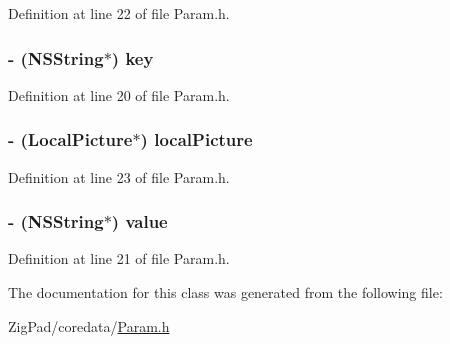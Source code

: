Definition at line 22 of file Param.h.

\hypertarget{interface_param_a0b6a9866e1390620790387442c1fb8be}{
\subsubsection[{key}]{\setlength{\rightskip}{0pt plus 5cm}-\/ (NSString$\ast$) key}}
\label{interface_param_a0b6a9866e1390620790387442c1fb8be}


Definition at line 20 of file Param.h.

\hypertarget{interface_param_a188b0e359426f49c922be3306c54e028}{
\subsubsection[{localPicture}]{\setlength{\rightskip}{0pt plus 5cm}-\/ ({\bf LocalPicture}$\ast$) localPicture}}
\label{interface_param_a188b0e359426f49c922be3306c54e028}


Definition at line 23 of file Param.h.

\hypertarget{interface_param_a450e6764e415b0f430eac319e099ba48}{
\subsubsection[{value}]{\setlength{\rightskip}{0pt plus 5cm}-\/ (NSString$\ast$) value}}
\label{interface_param_a450e6764e415b0f430eac319e099ba48}


Definition at line 21 of file Param.h.



The documentation for this class was generated from the following file:\begin{DoxyCompactItemize}
\item 
ZigPad/coredata/\hyperlink{_param_8h}{Param.h}\end{DoxyCompactItemize}
